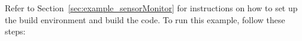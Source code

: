 %
%
%


Refer to Section~\ref{sec:example_sensorMonitor} for instructions on how to set up the build environment and build the code.
To run this example, follow these steps:

